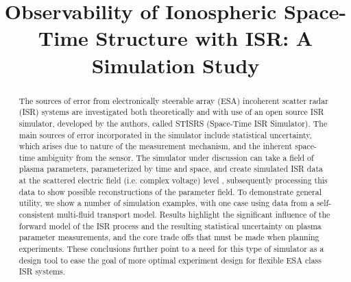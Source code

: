 \documentclass[draft,ras]{agutex}
\begin{document}
%
%


\title{Observability of Ionospheric Space-Time Structure with ISR:   A Simulation Study }

%
%


\begin{abstract}

The sources of error from electronically steerable array (ESA) incoherent scatter radar (ISR) systems are investigated both theoretically and with use of an open source ISR simulator, developed by the authors, called STISRS (Space-Time ISR Simulator). The main sources of error incorporated in the simulator include statistical uncertainty, which arises due to nature of the measurement mechanism, and the inherent space-time ambiguity from the sensor. The simulator under discussion can take a field of plasma parameters, parameterized by time and space, and create simulated ISR data at the scattered electric field (i.e. complex voltage) level , subsequently processing this data to show possible reconstructions of the parameter field. To demonstrate general utility, we show a number of simulation examples, with one case using data from a self-consistent multi-fluid transport model. Results highlight the significant influence of the forward model of the ISR process and the resulting statistical uncertainty on plasma parameter measurements, and the core trade offs that must be made when planning experiments. These conclusions further point to a need for this type of simulator as a design tool to ease the goal of more optimal experiment design for flexible ESA class ISR systems.


\end{abstract}
\end{document}
